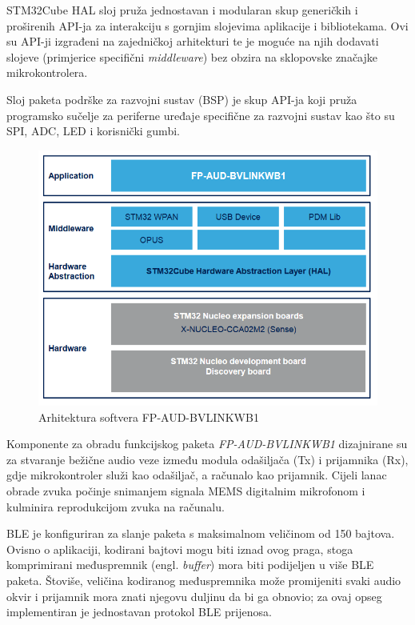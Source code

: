 STM32Cube HAL sloj pruža jednostavan i modularan skup generičkih i proširenih API-ja za interakciju s gornjim slojevima aplikacije i bibliotekama. Ovi su API-ji izgrađeni na zajedničkoj arhitekturi te je moguće na njih dodavati slojeve (primjerice specifični \textit{middleware}) bez obzira na sklopovske značajke mikrokontrolera.
 
Sloj paketa podrške za razvojni sustav (BSP) je skup API-ja koji pruža programsko sučelje za periferne uređaje specifične za razvojni sustav kao što su SPI, ADC, LED i korisnički gumbi. \cite{fpaudbvlink}

\begin{figure}[ht]
	\includegraphics[width=\linewidth]{imgs/firmware_software_arch}
	\caption{Arhitektura softvera FP-AUD-BVLINKWB1 \cite{fpaudbvlink}}
	\label{fig:firmware_software_arch}
\end{figure}

Komponente za obradu funkcijskog paketa \textit{FP-AUD-BVLINKWB1} dizajnirane su za stvaranje bežične audio veze između modula odašiljača (Tx) i prijamnika (Rx), gdje mikrokontroler služi kao odašiljač, a računalo kao prijamnik. Cijeli lanac obrade zvuka počinje snimanjem signala MEMS digitalnim mikrofonom i kulminira reprodukcijom zvuka na računalu.

BLE je konfiguriran za slanje paketa s maksimalnom veličinom od 150 bajtova. Ovisno o aplikaciji, kodirani bajtovi mogu biti iznad ovog praga, stoga komprimirani međuspremnik (engl. \textit{buffer}) mora biti podijeljen u više BLE paketa. Štoviše, veličina kodiranog međuspremnika može promijeniti svaki audio okvir i prijamnik mora znati njegovu duljinu da bi ga obnovio; za ovaj opseg implementiran je jednostavan protokol BLE prijenosa.

